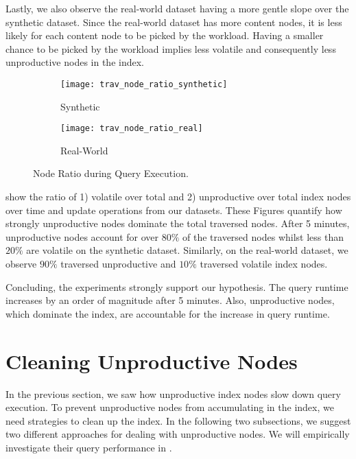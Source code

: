 \documentclass[abstracton,12pt]{scrartcl}
\theoremstyle{definition}
\begin{document}
Lastly, we also observe the real-world dataset having a more gentle slope over
the synthetic dataset. Since
the real-world dataset has more content nodes, it is less likely for each
content node to be picked by the workload. Having a smaller chance to be
picked by the workload implies less volatile and consequently less
unproductive nodes in the index.  

\begin{figure}[ht]
  \centering
  \begin{subfigure}{0.49\linewidth}
    \centering
    \caption{Synthetic}
    \texttt{[image: trav\_node\_ratio\_synthetic]}
    \label{fig:trav_node_ratio_synthetic}
  \end{subfigure}
  \begin{subfigure}{0.49\linewidth}
    \centering
    \caption{Real-World}
    \texttt{[image: trav\_node\_ratio\_real]}
    \label{fig:trav_node_ratio_real}
  \end{subfigure}
  \vspace{-0.5cm}
  \caption{Node Ratio during Query Execution.}
  \label{fig:trav_node_ratio}
\end{figure}

show the ratio of 1) volatile over total and 2) unproductive over total index nodes
over time and update operations from our datasets. These Figures quantify how
strongly unproductive nodes dominate the total traversed nodes. After 5 minutes,
unproductive nodes account for over $80\%$ of the traversed nodes whilst
less than $20\%$ are volatile on the synthetic dataset.
Similarly, on the real-world dataset, we observe $90\%$ traversed unproductive and $10\%$
traversed volatile index nodes.

Concluding, the experiments strongly support our hypothesis. The query runtime
increases by an order of magnitude after 5 minutes. Also, unproductive
nodes, which dominate the index, are accountable for the increase in query runtime. 

\newpage

\section{Cleaning Unproductive Nodes}

In the previous section, we saw how unproductive index nodes slow down query
execution. To prevent unproductive nodes from accumulating in the index, we
need strategies to clean up the index. In the following two subsections, we suggest two
different approaches for dealing with unproductive nodes. We will empirically
investigate their query performance in .
\end{document}
